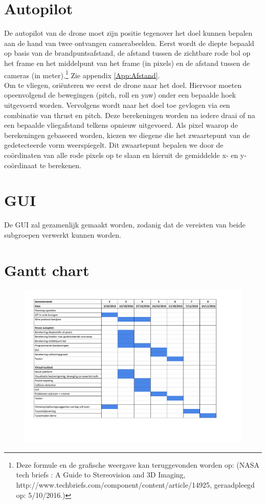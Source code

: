 \documentclass{peno-opdracht1}
\begin{document}
\section{Autopilot}
De autopilot van de drone moet zijn positie tegenover het doel kunnen bepalen aan de hand van twee ontvangen camerabeelden. Eerst wordt de diepte bepaald op basis van de brandpuntsafstand, de afstand tussen de zichtbare rode bol op het frame en het middelpunt van het frame (in pixels) en de afstand tussen de camera\textquotesingle s (in meter).\footnote{Deze formule en de grafische weergave kan teruggevonden worden op: (NASA tech briefs : A Guide to Stereovision and 3D Imaging, http://www.techbriefs.com/component/content/article/14925, geraadpleegd op: 5/10/2016.)\label{refnote}} Zie appendix \ref{App:Afstand}. \\
Om te vliegen, ori\"enteren we eerst de drone naar het doel. Hiervoor moeten opeenvolgend de bewegingen (pitch, roll en yaw) onder een bepaalde hoek uitgevoerd worden. Vervolgens wordt naar het doel toe gevlogen via een combinatie van thrust en pitch.
Deze berekeningen worden na iedere draai of na een bepaalde vliegafstand telkens opnieuw uitgevoerd.
Als pixel waarop de berekeningen gebaseerd worden, kiezen we diegene die het zwaartepunt van de gedetecteerde vorm weerspiegelt. Dit zwaartepunt bepalen we door de co\"ordinaten van alle rode pixels op te slaan en hieruit de gemiddelde x- en y-co\"ordinaat te berekenen.

\section{GUI}
De GUI zal gezamenlijk gemaakt worden, zodanig dat de vereisten van beide subgroepen verwerkt kunnen worden. \\

\newpage
\appendix
\section{Gantt chart} \label{App:Planning}

\begin{figure}[h!]
	\begin{center}
		\includegraphics[scale=0.55]{Planning.pdf}
	\end{center}
\end{figure}
\end{document}
